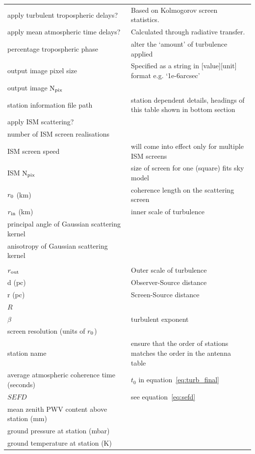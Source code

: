 \begin{longtable}{p{0.5\linewidth}|p{0.6\linewidth}}
apply turbulent tropospheric delays?&Based on Kolmogorov screen statistics.\\
apply mean atmospheric time delays?&Calculated through radiative transfer.\\
percentage tropospheric phase&alter the `amount' of turbulence applied\\
output image pixel size&Specified as a string in [value][unit] format e.g. `1e-6arcsec'\\
output image ${\rm N_{pix}}$&\\
station information file path& station dependent details, headings of this table shown in bottom section\\
\hline
\hline
apply ISM scattering?&\\
number of ISM screen realisations&  \\
ISM screen speed& will come into effect only for multiple ISM screens\\
ISM ${\rm N_{pix}}$& size of screen for one (square) {\sc fits} sky model\\
 $r_{\rm 0}$ (km) & coherence length on the scattering screen \\
$r_{\rm in}$ (km)& inner scale of turbulence\\ 
principal angle of Gaussian scattering kernel &\\
anisotropy of Gaussian scattering kernel\\            \\
$r_{\rm out}$    & Outer scale of turbulence   \\
d (pc)      & Observer-Source distance      \\
r (pc)      & Screen-Source distance      \\
$R$              & \\
$\beta$ & turbulent exponent         \\
screen resolution (units of $r_{\rm 0}$)& \\
\hline
\hline
station name&ensure that the order of stations matches the order in the antenna table \\
average atmospheric coherence time (seconds)& $t_0$ in equation~\ref{eq:turb_final} \\
$SEFD$& see equation~\ref{eq:sefd}\\
mean zenith PWV content above station (mm)& \\
ground pressure at station (mbar)& \\
ground temperature at station (K)&\\

\end{longtable}

